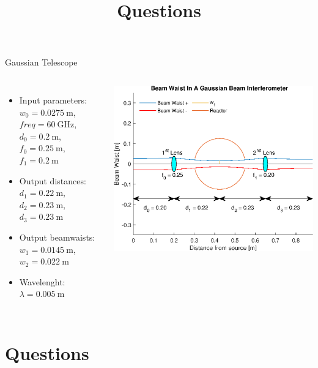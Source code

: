 \documentclass[hyperref={colorlinks=true,urlcolor=blue,linkcolor=.},aspectratio=1610,mathserif]{beamer}
\begin{document}
\begin{frame}{Gaussian Telescope}
	\begin{columns}
		\begin{itemize}
			\item Input parameters:\\
			\(w_0 = \SI{0.0275}{\meter}\), \(freq = \SI{60}{\giga\hertz}\), \(d_0 = \SI{0.2}{\meter}\), \(f_0 = \SI{0.25}{\meter}\), \(f_1 = \SI{0.2}{\meter}\)
			\item Output distances:\\
			\(d_1 = \SI{0.22}{\meter}\), \(d_2 = \SI{0.23}{\meter}\), \(d_3 = \SI{0.23}{\meter}\)
			\item Output beamwaists:\\
			\(w_1 = \SI{0.0145}{\meter}\), \(w_2 = \SI{0.022}{\meter}\)
			\item Wavelenght: \(\lambda = \SI{0.005}{\meter}\)
		\end{itemize}
		\includegraphics[width=\textwidth]{MatlabFigures/Interferometer/Interferometer.eps}
	\end{columns}
\end{frame}
\section*{Questions}
\title{Questions}
\subtitle{}
\begin{frame}
	\titlepage
\end{frame}
\end{document}
